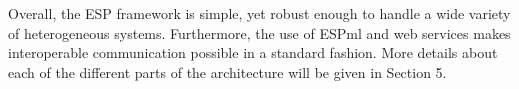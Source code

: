 Overall, the ESP framework is simple, yet robust enough to handle a wide variety of heterogeneous systems.  Furthermore, the use of ESPml and web services makes interoperable communication
possible in a standard fashion.  More details about each of the different parts of the architecture will be given in Section 5.

